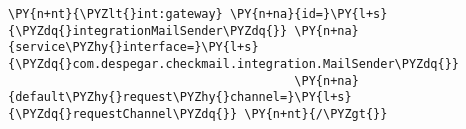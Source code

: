 \begin{Verbatim}[commandchars=\\\{\}]
\PY{n+nt}{\PYZlt{}int:gateway} \PY{n+na}{id=}\PY{l+s}{\PYZdq{}integrationMailSender\PYZdq{}} \PY{n+na}{service\PYZhy{}interface=}\PY{l+s}{\PYZdq{}com.despegar.checkmail.integration.MailSender\PYZdq{}} 
                                        \PY{n+na}{default\PYZhy{}request\PYZhy{}channel=}\PY{l+s}{\PYZdq{}requestChannel\PYZdq{}} \PY{n+nt}{/\PYZgt{}}
\end{Verbatim}
